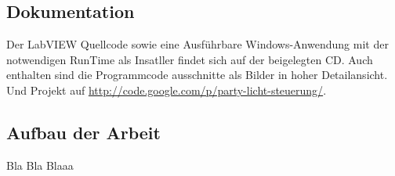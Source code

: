 
\subsection{Dokumentation}
Der LabVIEW Quellcode  sowie eine Ausführbare Windows-Anwendung mit der notwendigen RunTime als Insatller findet sich auf der beigelegten CD.
Auch enthalten sind die Programmcode ausschnitte als Bilder in hoher Detailansicht.
Und Projekt auf \url{http://code.google.com/p/party-licht-steuerung/}.


\subsection{Aufbau der Arbeit}

Bla Bla Blaaa





